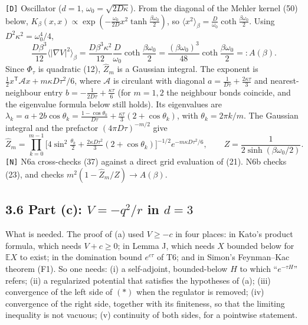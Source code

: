 \documentclass[11pt,a4paper]{article}
\begin{document}
\texttt{[D]} Oscillator (\(d=1\), \(\omega_0=\sqrt{2D\kappa}\)). From the diagonal of the Mehler kernel (50) below, \(K_\beta(x,x)\propto\exp(-\frac{\omega_0}{2D}x^2\tanh\frac{\beta\omega_0}2)\), so \(\langle x^2\rangle_\beta=\frac{D}{\omega_0}\coth\frac{\beta\omega_0}2\). Using \(D^2\kappa^2=\omega_0^4/4\),
\[\frac{D\beta^3}{12}\langle|\nabla V|^2\rangle_\beta=\frac{D\beta^3\kappa^2}{12}\frac D{\omega_0}\coth\frac{\beta\omega_0}2=\frac{(\beta\omega_0)^3}{48}\coth\frac{\beta\omega_0}2=:A(\beta).\tag{36}\]
Since \(\Phi_\tau\) is quadratic (12), \(\hat Z_m\) is a Gaussian integral. The exponent is \(\tfrac12x^{\mathsf T}\mathcal A x+m\kappa D\tau^2/6\), where \(\mathcal A\) is circulant with diagonal \(a=\frac1{D\tau}+\frac{2\kappa\tau}3\) and nearest-neighbour entry \(b=-\frac1{2D\tau}+\frac{\kappa\tau}6\) (for \(m=1,2\) the neighbour bonds coincide, and the eigenvalue formula below still holds). Its eigenvalues are \(\lambda_k=a+2b\cos\theta_k=\frac{1-\cos\theta_k}{D\tau}+\frac{\kappa\tau}3(2+\cos\theta_k)\), with \(\theta_k=2\pi k/m\). The Gaussian integral and the prefactor \((4\pi D\tau)^{-m/2}\) give
\[\hat Z_m=\prod_{k=0}^{m-1}\Big[4\sin^2\tfrac{\theta_k}2+\tfrac{2\kappa D\tau^2}3(2+\cos\theta_k)\Big]^{-1/2}e^{-m\kappa D\tau^2/6},\qquad Z=\frac1{2\sinh(\beta\omega_0/2)}.\tag{37}\]
\texttt{[N]} N6a cross-checks (37) against a direct grid evaluation of (21). N6b checks (23), and checks \(m^2(1-\hat Z_m/Z)\to A(\beta)\).

\hypertarget{part-c-v-q2r-in-d3}{%
\subsection{\texorpdfstring{3.6 Part (c): \(V=-q^2/r\) in \(d=3\)}{3.6 Part (c): V=-q\^{}2/r in d=3}}\label{part-c-v-q2r-in-d3}}

What is needed. The proof of (a) used \(V\ge-c\) in four places: in Kato's product formula, which needs \(V+c\ge0\); in Lemma J, which needs \(X\) bounded below for \(\mathbb EX\) to exist; in the domination bound \(e^{c\tau}\) of T6; and in Simon's Feynman--Kac theorem (F1). So one needs: (i) a self-adjoint, bounded-below \(H\) to which ``\(e^{-\tau H}\)'' refers; (ii) a regularized potential that satisfies the hypotheses of (a); (iii) convergence of the left side of \((\ast)\) when the regulator is removed; (iv) convergence of the right side, together with its finiteness, so that the limiting inequality is not vacuous; (v) continuity of both sides, for a pointwise statement.
\end{document}
